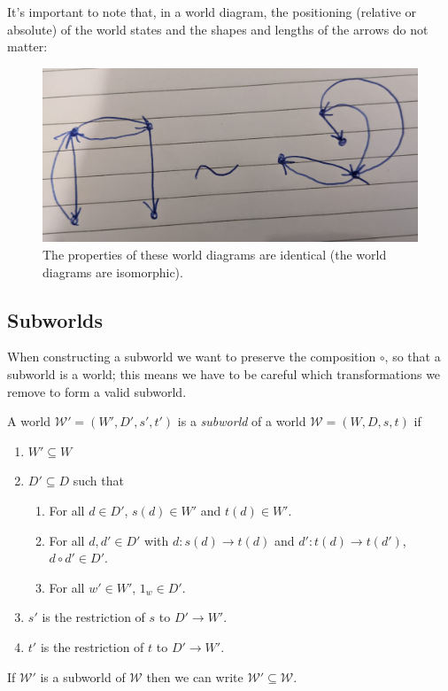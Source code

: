 It's important to note that, in a world diagram, the positioning (relative or absolute) of the world states and the shapes and lengths of the arrows do not matter:
\begin{figure}[H]
	\centering
	\includegraphics[width=0.5\linewidth]{2MathematicalFramework/Images/isomorphic_world_diagrams.jpeg}
	\caption{The properties of these world diagrams are identical (the world diagrams are isomorphic).}
	\label{fig:isomorphic_world_diagrams}
\end{figure}

\subsection{Subworlds}

When constructing a subworld we want to preserve the composition $\circ$, so that a subworld is a world; this means we have to be careful which transformations we remove to form a valid subworld.

A world $\mathscr{W}' = (W', D', s', t')$ is a \emph{subworld} of a world $\mathscr{W} = (W, D, s, t)$ if
\begin{enumerate}
    \item $W' \subseteq W$
    \item $D' \subseteq D$ such that
    \begin{enumerate}
        \item For all $d \in D'$, $s(d) \in W'$ and $t(d) \in W'$.
        \item For all $d, d' \in D'$ with $d: s(d) \to t(d)$ and $d': t(d) \to t(d')$, $d \circ d' \in D'$.
        \item For all $w' \in W'$, $1_{w} \in D'$.
    \end{enumerate}
    \item $s'$ is the restriction of $s$ to $D' \to W'$.
    \item $t'$ is the restriction of $t$ to $D' \to W'$.
\end{enumerate}

\begin{definition}
    If $\mathscr{W}'$ is a subworld of $\mathscr{W}$ then we can write $\mathscr{W}' \subseteq \mathscr{W}$.
\end{definition}



